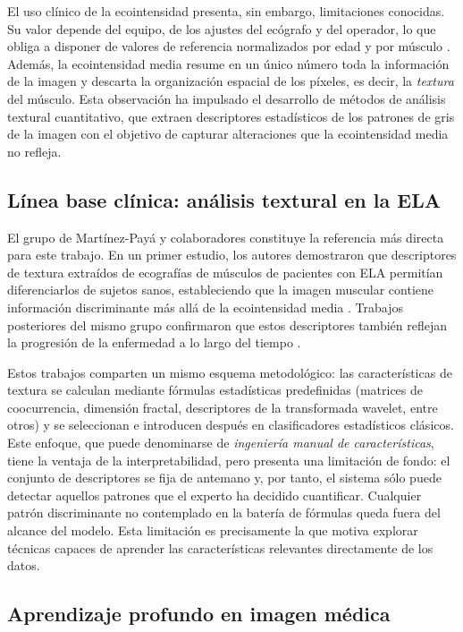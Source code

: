\documentclass[12pt]{extarticle}
\numberwithin{equation}{section}
\begin{document}
\begin{refsection}
El uso clínico de la ecointensidad presenta, sin embargo, limitaciones conocidas. Su valor depende del equipo, de los ajustes del ecógrafo y del operador, lo que obliga a disponer de valores de referencia normalizados por edad y por músculo \cite{arts2010normal}. Además, la ecointensidad media resume en un único número toda la información de la imagen y descarta la organización espacial de los píxeles, es decir, la \textit{textura} del músculo. Esta observación ha impulsado el desarrollo de métodos de análisis textural cuantitativo, que extraen descriptores estadísticos de los patrones de gris de la imagen con el objetivo de capturar alteraciones que la ecointensidad media no refleja.

\subsection{Línea base clínica: análisis textural en la ELA}\label{subsec:linea-base}

El grupo de Martínez-Payá y colaboradores constituye la referencia más directa para este trabajo. En un primer estudio, los autores demostraron que descriptores de textura extraídos de ecografías de músculos de pacientes con ELA permitían diferenciarlos de sujetos sanos, estableciendo que la imagen muscular contiene información discriminante más allá de la ecointensidad media \cite{martinezpaya2017quantitative}. Trabajos posteriores del mismo grupo confirmaron que estos descriptores también reflejan la progresión de la enfermedad a lo largo del tiempo \cite{martinezpaya2018monitoring}.

Estos trabajos comparten un mismo esquema metodológico: las características de textura se calculan mediante fórmulas estadísticas predefinidas (matrices de coocurrencia, dimensión fractal, descriptores de la transformada wavelet, entre otros) y se seleccionan e introducen después en clasificadores estadísticos clásicos. Este enfoque, que puede denominarse de \textit{ingeniería manual de características}, tiene la ventaja de la interpretabilidad, pero presenta una limitación de fondo: el conjunto de descriptores se fija de antemano y, por tanto, el sistema sólo puede detectar aquellos patrones que el experto ha decidido cuantificar. Cualquier patrón discriminante no contemplado en la batería de fórmulas queda fuera del alcance del modelo. Esta limitación es precisamente la que motiva explorar técnicas capaces de aprender las características relevantes directamente de los datos.

\subsection{Aprendizaje profundo en imagen médica}\label{subsec:dl}


\end{refsection}
\end{document}
